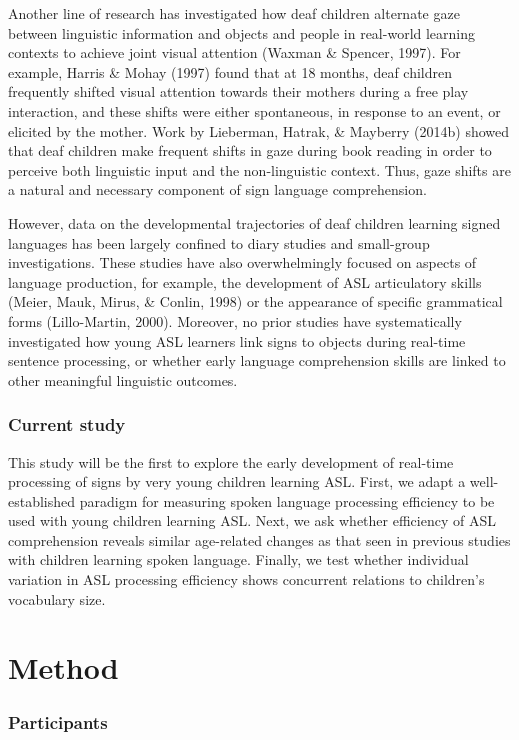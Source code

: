 \documentclass[12pt,]{article}
\begin{document}
Another line of research has investigated how deaf children alternate
gaze between linguistic information and objects and people in real-world
learning contexts to achieve joint visual attention (Waxman \& Spencer,
1997). For example, Harris \& Mohay (1997) found that at 18 months, deaf
children frequently shifted visual attention towards their mothers
during a free play interaction, and these shifts were either
spontaneous, in response to an event, or elicited by the mother. Work by
Lieberman, Hatrak, \& Mayberry (2014b) showed that deaf children make
frequent shifts in gaze during book reading in order to perceive both
linguistic input and the non-linguistic context. Thus, gaze shifts are a
natural and necessary component of sign language comprehension.

However, data on the developmental trajectories of deaf children
learning signed languages has been largely confined to diary studies and
small-group investigations. These studies have also overwhelmingly
focused on aspects of language production, for example, the development
of ASL articulatory skills (Meier, Mauk, Mirus, \& Conlin, 1998) or the
appearance of specific grammatical forms (Lillo-Martin, 2000). Moreover,
no prior studies have systematically investigated how young ASL learners
link signs to objects during real-time sentence processing, or whether
early language comprehension skills are linked to other meaningful
linguistic outcomes.

\subsubsection{Current study}\label{current-study}

This study will be the first to explore the early development of
real-time processing of signs by very young children learning ASL.
First, we adapt a well-established paradigm for measuring spoken
language processing efficiency to be used with young children learning
ASL. Next, we ask whether efficiency of ASL comprehension reveals
similar age-related changes as that seen in previous studies with
children learning spoken language. Finally, we test whether individual
variation in ASL processing efficiency shows concurrent relations to
children's vocabulary size.

\section{Method}\label{method}

\subsubsection{Participants}\label{participants}
\end{document}
